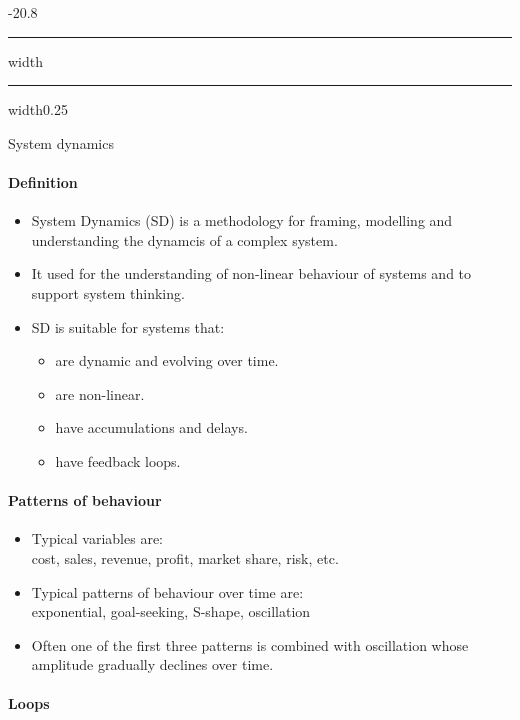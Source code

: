 \documentclass[a4paper, landscape, 6pt, fleqn]{scrartcl}
\makeatletter
\renewcommand{\subsection}{\@startsection{subsection}{1}{0mm}%
{-2\baselineskip}{0.8\baselineskip}%
{\hrule depth 0.2pt width\columnwidth\hrule depth0.75pt
width0.25\columnwidth\vspace*{1.2em}\large\bfseries}}
\makeatother
\begin{document}
\begin{multicols*}{4}
\subsection{System dynamics}

\paragraph{Definition}

\begin{itemize}
\item System Dynamics (SD) is a methodology for framing, modelling and understanding the dynamcis of a complex system.
\item It used for the understanding of non-linear behaviour of systems and to support system thinking.
\item SD is suitable for systems that:
\begin{itemize}
\item are dynamic and evolving over time.
\item are non-linear.
\item have accumulations and delays.
\item have feedback loops.
\end{itemize}
\end{itemize}

\paragraph{Patterns of behaviour}

\begin{itemize}
\item Typical variables are: \\
cost, sales, revenue, profit, market share, risk, etc.
\item Typical patterns of behaviour over time are: \\
exponential, goal-seeking, S-shape, oscillation
\item Often one of the first three patterns is combined with oscillation whose amplitude gradually declines over time.
\end{itemize}

\paragraph{Loops}


\end{multicols*}
\end{document}
